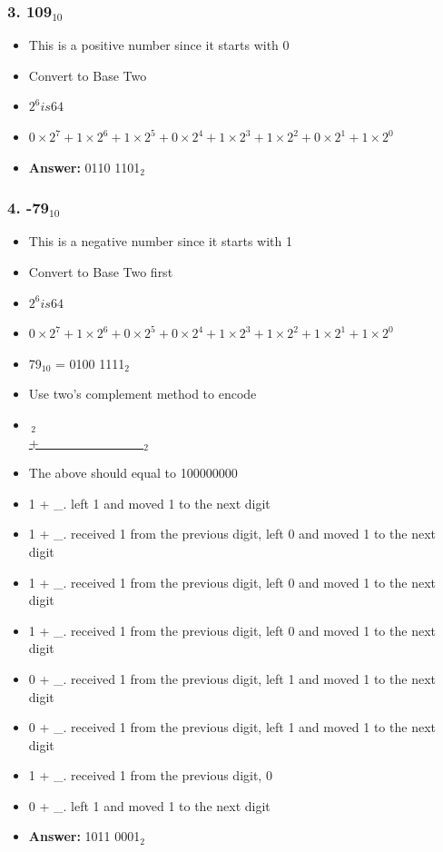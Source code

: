 \documentclass[11pt, oneside]{article}
\begin{document}
\subsubsection*{3. 109$_{10}$}

\begin{itemize}
    \item This is a positive number since it starts with 0
    \item Convert to Base Two
    \item \(2^6 is 64\)
    \item \(0\times2^7 + 1\times2^6 + 1\times2^5 + 0\times2^4 + 1\times2^3 + 1\times2^2 + 0\times2^1 + 1\times2^0\)
    \item \textbf{Answer:} 0110 1101$_{2}$
\end{itemize}

\pagebreak

\subsubsection*{4. -79$_{10}$}

\begin{itemize}
    \item This is a negative number since it starts with 1
    \item Convert to Base Two first
    \item \(2^6 is 64\)
    \item \(0\times2^7 + 1\times2^6 + 0\times2^5 + 0\times2^4 + 1\times2^3 + 1\times2^2 + 1\times2^1 + 1\times2^0\)
    \item 79$_{10}$ = 0100 1111$_{2}$
    \item Use two’s complement method to encode
    \item \,\;$_{2}$ \\\underline{+\_\_\_\_\_\_\_\_\_\_\_$_{2}$}
    \item The above should equal to 100000000
    \item 1 + \_. left 1 and moved 1 to the next digit
    \item 1 + \_. received 1 from the previous digit, left 0 and moved 1 to the next digit
    \item 1 + \_. received 1 from the previous digit, left 0 and moved 1 to the next digit
    \item 1 + \_. received 1 from the previous digit, left 0 and moved 1 to the next digit
    \item 0 + \_. received 1 from the previous digit, left 1 and moved 1 to the next digit
    \item 0 + \_. received 1 from the previous digit, left 1 and moved 1 to the next digit
    \item 1 + \_. received 1 from the previous digit, 0
    \item 0 + \_. left 1 and moved 1 to the next digit
    \item \textbf{Answer:} 1011 0001$_{2}$
\end{itemize}
\end{document}
